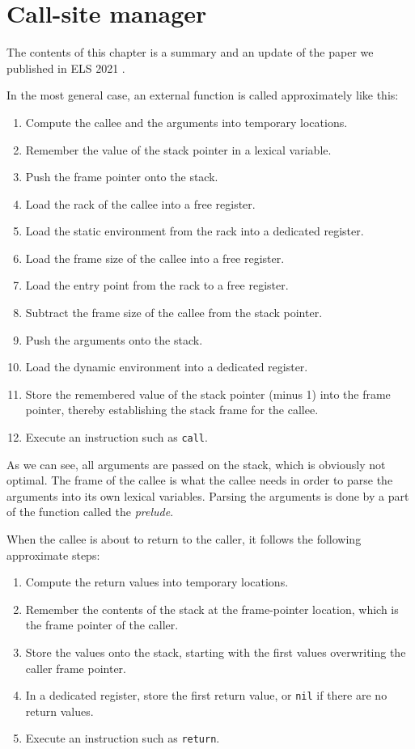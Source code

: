 \chapter{Call-site manager}
\label{chap-call-site-manager}

The contents of this chapter is a summary and an update of the paper
we published in ELS 2021 \cite{DBLP:conf/els/Strandh21}.

In the most general case, an external function is called approximately
like this:
\begin{enumerate}
\item Compute the callee and the arguments into temporary locations.
\item Remember the value of the stack pointer in a lexical variable.
\item Push the frame pointer onto the stack.
\item Load the rack of the callee into a free register.
\item Load the static environment from the rack into a dedicated
  register.
\item Load the frame size of the callee into a free register.
\item Load the entry point from the rack to a free register.
\item Subtract the frame size of the callee from the stack
  pointer.
\item Push the arguments onto the stack.
\item Load the dynamic environment into a dedicated register.
\item Store the remembered value of the stack pointer (minus 1) into
  the frame pointer, thereby establishing the stack frame for the
  callee.
\item Execute an instruction such as \texttt{call}.
\end{enumerate}

As we can see, all arguments are passed on the stack, which is
obviously not optimal.  The frame of the callee is what the
callee needs in order to parse the arguments into its own lexical
variables.  Parsing the arguments is done by a part of the function
called the \emph{prelude}.

When the callee is about to return to the caller, it follows the
following approximate steps:

\begin{enumerate}
\item Compute the return values into temporary locations.
\item Remember the contents of the stack at the frame-pointer
  location, which is the frame pointer of the caller.
\item Store the values onto the stack, starting with the first values
  overwriting the caller frame pointer.
\item In a dedicated register, store the first return value, or
  \texttt{nil} if there are no return values.
\item Execute an instruction such as \texttt{return}.
\end{enumerate}

